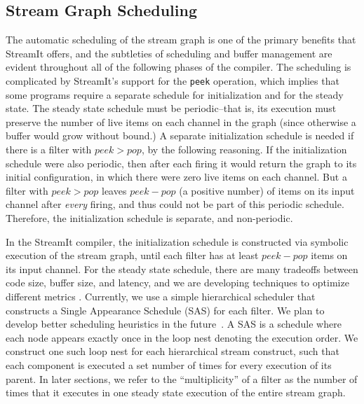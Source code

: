 \subsection{Stream Graph Scheduling}
The automatic scheduling of the stream graph is one of the primary
benefits that StreamIt offers, and the subtleties of scheduling and
buffer management are evident throughout all of the following phases
of the compiler.  The scheduling is complicated by StreamIt's support
for the {\tt peek} operation, which implies that some programs require
a separate schedule for initialization and for the steady state.  The
steady state schedule must be periodic--that is, its execution must
preserve the number of live items on each channel in the graph (since
otherwise a buffer would grow without bound.)  A separate
initialization schedule is needed if there is a filter with $peek >
pop$, by the following reasoning.  If the initialization schedule were
also periodic, then after each firing it would return the graph to its
initial configuration, in which there were zero live items on each
channel.  But a filter with $peek > pop$ leaves $peek-pop$ (a positive
number) of items on its input channel after {\it every} firing, and
thus could not be part of this periodic schedule.  Therefore, the
initialization schedule is separate, and non-periodic.

In the StreamIt compiler, the initialization schedule is constructed
via symbolic execution of the stream graph, until each filter has at
least $peek-pop$ items on its input channel.  For the steady state
schedule, there are many tradeoffs between code size, buffer size, and
latency, and we are developing techniques to optimize different
metrics \cite{streamittech2}.  Currently, we use a simple hierarchical
scheduler that constructs a Single Appearance Schedule (SAS)
\cite{leesdf} for each filter.  We plan to develop better scheduling
heuristics in the future~\cite{Karczma-thesis}.  A SAS is a schedule
where each node appears exactly once in the loop nest denoting the
execution order.  We construct one such loop nest for each
hierarchical stream construct, such that each component is executed a
set number of times for every execution of its parent.  In later
sections, we refer to the ``multiplicity'' of a filter as the number
of times that it executes in one steady state execution of the entire
stream graph.

